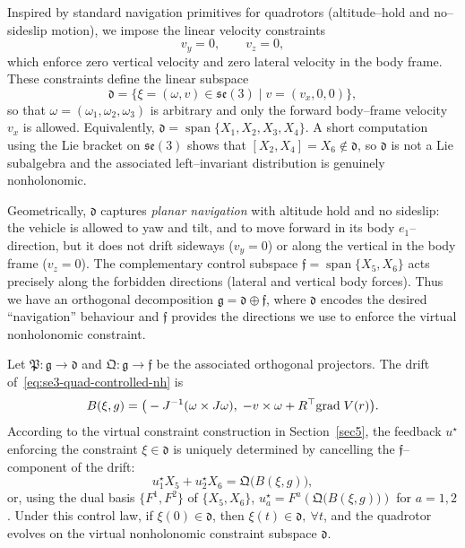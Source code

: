 \documentclass[letterpaper, 10 pt, conference]{ieeeconf}
\newcommand{\grad}{\normalfont{\text{grad}}}
\begin{document}
Inspired by standard navigation primitives for quadrotors (altitude--hold and
no--sideslip motion), we impose the linear velocity constraints
\begin{equation}\label{eq:quad-nh-constraints-new}
v_y = 0,
\qquad
v_z = 0,
\end{equation}
which enforce zero vertical velocity and zero lateral velocity in the body
frame.  These constraints define the linear subspace
\[
\mathfrak d
=\{\xi=(\omega,v)\in\mathfrak{se}(3)\mid v=(v_x,0,0)\},
\]
so that $\omega=(\omega_1,\omega_2,\omega_3)$ is arbitrary and only the
forward body--frame velocity $v_x$ is allowed.  Equivalently, $\mathfrak d=\operatorname{span}\{X_1,X_2,X_3,X_4\}$. A short computation using the Lie bracket on $\mathfrak{se}(3)$ shows that
$[X_2,X_4]=X_6\notin\mathfrak d$, so $\mathfrak d$ is not a Lie subalgebra and the associated left--invariant
distribution is genuinely nonholonomic.

Geometrically, $\mathfrak d$ captures \emph{planar navigation} with
altitude hold and no sideslip: the vehicle is allowed to yaw and tilt, and
to move forward in its body $e_1$--direction, but it does not drift
sideways ($v_y=0$) or along the vertical in the body frame ($v_z=0$).
The complementary control subspace $\mathfrak f = \operatorname{span}\{X_5,X_6\}$ acts precisely along the forbidden directions (lateral and vertical body
forces).  Thus we have an orthogonal decomposition
$\mathfrak g = \mathfrak d \oplus \mathfrak f$, where $\mathfrak d$ encodes the desired ``navigation'' behaviour and
$\mathfrak f$ provides the directions we use to enforce the virtual
nonholonomic constraint.

Let $\mathfrak P:\mathfrak g\to\mathfrak d$ and
$\mathfrak Q:\mathfrak g\to\mathfrak f$ be the associated orthogonal
projectors.  The drift of~\eqref{eq:se3-quad-controlled-nh} is
\[
B(\xi,g)
= \big(-J^{-1}(\omega\times J\omega),\; -v\times\omega + R^{\top}\grad \; V(r)\big).
\]
According to the virtual constraint construction in
Section~\ref{sec5}, the feedback $u^\star$ enforcing the constraint
$\xi\in\mathfrak d$ is uniquely determined by cancelling the
$\mathfrak f$--component of the drift:
\[
u^{\star}_1X_5+u^{\star}_2X_6
= \mathfrak Q\big(B(\xi,g)\big),
\]
or, using the dual basis $\{F^1,F^2\}$ of $\{X_5,X_6\}$, $u^{\star}_a = F^a\!\left(\mathfrak Q\big(B(\xi,g)\big)\right)$ for $a=1,2$. Under this control law, if $\xi(0)\in\mathfrak d$, then $\xi(t)\in\mathfrak d,\ \forall t$, and the quadrotor evolves on the virtual nonholonomic constraint subspace $\mathfrak d$.
\end{document}
